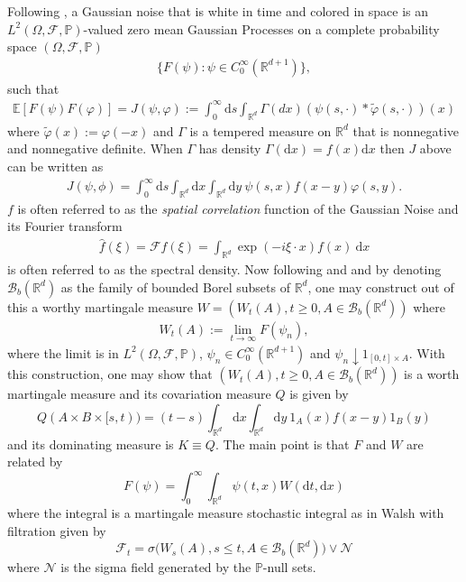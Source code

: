 \documentclass[a4paper,11pt]{article}%
\numberwithin{equation}{section}
\theoremstyle{plain}
\theoremstyle{definition}
\newcommand{\R}{\mathbb{R}}
\newcommand{\E}{\mathbb{E}}
\newcommand{\ud}{\ensuremath{ \mathrm{d} }}
\begin{document}
Following \cite{DalangEtc09Minicourse}, a Gaussian noise that is white in time and colored in space is an
$L^2(\Omega,\mathcal F,\mathbb P)$-valued zero mean Gaussian Processes on a complete probability space $(\Omega,\mathcal F,\mathbb P)$
\begin{align*}
\{ F(\psi) : \psi \in C_0^\infty(\R^{d+1}) \} ,
\end{align*}
such that
\begin{align}
	\label{E:Cor}
	\E \left[ F\left(\psi\right)F(\varphi) \right]  = J(\psi,\varphi)
                                                 := \int_0^\infty \ud s \int_{\R^d} \Gamma(dx)(\psi(s,\cdot)*\tilde{\varphi}(s,\cdot))(x)
\end{align}
where $\tilde{\varphi}(x):= \varphi(-x)$ and $\Gamma$ is a tempered measure on $\R^d$ that is nonnegative and nonnegative definite. When $\Gamma$ has density $\Gamma(\ud x) = f(x)\ud x$ then $J$ above can be written as
\begin{align*}
	J(\psi,\phi) = \int_0^\infty \ud s \int_{\R^d} \ud x \int_{\R^d} \ud y \: \psi(s,x)f(x-y)\varphi(s,y).
\end{align*}
$f$ is often referred to as the \textit{spatial correlation} function of the Gaussian Noise and its Fourier transform
\begin{align*}
\hat{f}(\xi)=\mathcal Ff(\xi) = \int_{\R^d}\exp(-i\xi\cdot x)f(x) \: \ud x
\end{align*}
is often referred to as the spectral density. Now following \cite{Walsh} and \cite{DalangEtc09Minicourse} and by
denoting $\mathscr B_b(\R^d)$ as the family of bounded Borel subsets of $\R^d$, one may construct out of this a worthy
martingale measure $W=(W_t(A),t\ge 0, A \in \mathscr B_b(\R^d))$ where
\begin{align*}
W_t(A):= \lim \limits_{t\to \infty} F(\psi_n),
\end{align*}
where the limit is in $L^2(\Omega,\mathcal F,\mathbb P)$, $\psi_n \in C_0^\infty(\R^{d+1})$ and $\psi_n \downarrow
1_{[0,t]\times A}. $ With this construction, one may show that $(W_t(A),t\ge 0, A \in \mathscr B_b(\R^d))$ is a worth
martingale measure and its covariation measure $Q$ is given by
\begin{equation*}
	Q(A \times B \times [s,t)) = (t-s)\int_{\R^d} \ud x \int_{\R^d} \ud y \: 1_A(x)f(x-y)1_B(y)
\end{equation*}
and its dominating measure is $K \equiv Q$. The main point is that $F$ and $W$ are related by
\begin{equation*}
	F(\psi) = \int_0^\infty \int_{\R^d} \psi (t,x) W(\ud t, \ud x)
\end{equation*}
where the integral is a martingale measure stochastic integral as in Walsh with filtration given by
\begin{equation*}
	\mathcal F_t = \sigma \big(W_s(A), s \le t, A \in \mathscr B_b(\R^d) \big) \vee \mathscr N
\end{equation*}
where $\mathscr N$ is the sigma field generated by the $\mathbb P$-null sets.
\end{document}
